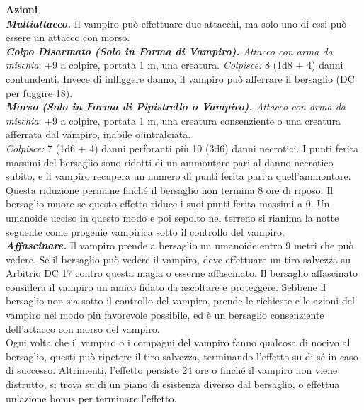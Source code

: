 \begin{multicols}{2}
\smallskip\textbf{Azioni}\\
\emph{\textbf{Multiattacco.}} Il vampiro può effettuare due attacchi, ma solo uno di essi può essere un attacco con morso.\\
\emph{\textbf{Colpo Disarmato (Solo in Forma di Vampiro).} Attacco con arma da mischia}: +9 a colpire, portata 1 m, una creatura. \emph{Colpisce:} 8 (1d8 + 4) danni contundenti. Invece di infliggere danno, il vampiro può afferrare il bersaglio (DC per fuggire 18).\\
\emph{\textbf{Morso (Solo in Forma di Pipistrello o Vampiro).} Attacco con arma da mischia}: +9 a colpire, portata 1 m, una creatura consenziente o una creatura afferrata dal vampiro, inabile o intralciata.\\

\emph{Colpisce:} 7 (1d6 + 4) danni perforanti più 10 (3d6) danni necrotici. I punti ferita massimi del bersaglio sono ridotti di un ammontare pari al danno necrotico subito, e il vampiro recupera un numero di punti ferita pari a quell'ammontare. Questa riduzione permane finché il bersaglio non termina 8 ore di riposo. Il bersaglio muore se questo effetto riduce i suoi punti ferita massimi a 0. Un umanoide ucciso in questo modo e poi sepolto nel terreno si rianima la notte seguente come progenie vampirica sotto il controllo del vampiro. \\

\emph{\textbf{Affascinare.}} Il vampiro prende a bersaglio un umanoide entro 9 metri che può vedere. Se il bersaglio può vedere il vampiro, deve effettuare un tiro salvezza su Arbitrio DC 17 contro questa magia o esserne affascinato. Il bersaglio affascinato considera il vampiro un amico fidato da ascoltare e proteggere. Sebbene il bersaglio non sia sotto il controllo del vampiro, prende le richieste e le azioni del vampiro nel modo più favorevole possibile, ed è un bersaglio consenziente dell'attacco con morso del vampiro.\\

Ogni volta che il vampiro o i compagni del vampiro fanno qualcosa di nocivo al bersaglio, questi può ripetere il tiro salvezza, terminando l'effetto su di sé in caso di successo. Altrimenti, l'effetto persiste 24 ore o finché il vampiro non viene distrutto, si trova su di un piano di esistenza diverso dal bersaglio, o effettua un'azione bonus per terminare l'effetto.\\


\end{multicols}
